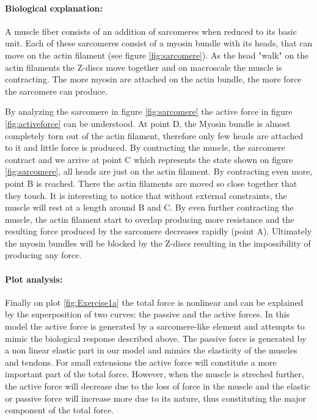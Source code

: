 \documentclass{cmc}
\begin{document}
\paragraph{Biological explanation:} A muscle fiber consists of an addition of sarcomeres when reduced to its basic unit. Each of these sarcomeres consist of a myosin bundle with its heads, that can move on the actin filament (see figure \ref{fig:sarcomere}). As the head "walk" on the actin filaments the Z-discs move together and on macroscale the muscle is contracting. The more myosin are attached on the actin bundle, the more force the sarcomere can produce. 

By analyzing the sarcomere in figure \ref{fig:sarcomere} the active force in figure \ref{fig:activeforce} can be understood. At point D, the Myosin bundle is almost completely torn out of the actin filament, therefore only few heads are attached to it and little force is produced. By contracting the muscle, the sarcomere contract and we arrive at point C which represents the state shown on figure \ref{fig:sarcomere}, all heads are just on the actin filament. By contracting even more, point B is reached. There the actin filaments are moved so close together that they touch. It is interesting to notice that without external constraints, the muscle will rest at a length around B and C. By even further contracting the muscle, the actin filament start to overlap producing more resistance and the resulting force produced by the sarcomere decreases rapidly (point A). Ultimately the myosin bundles will be blocked by the Z-discs resulting in the impossibility of producing any force.

\paragraph{Plot analysis:} Finally on plot \ref{fig:Exercise1a} the total force is nonlinear and can be explained by the superposition of two curves: the passive and the active forces. In this model the active force is generated by a sarcomere-like element and attempts to mimic the biological response described above. The passive force is generated by a non linear elastic part in our model and mimics the elasticity of the muscles and tendons. For small extensions the active force will constitute a more important part of the total force. However, when the muscle is streched further, the active force will decrease due to the loss of force in the muscle and the elastic or passive force will increase more due to its nature, thus constituting the major component of the total force.
\vfill
\clearpage
\end{document}
